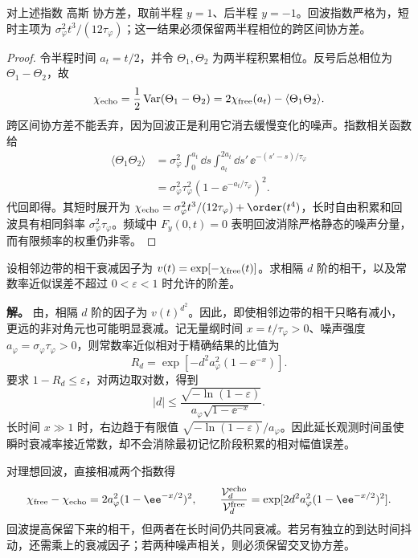 \begin{proposition}[指数相关噪声的单次反号回波]
对上述指数 高斯 协方差，取前半程 $y=1$、后半程 $y=-1$。回波指数严格为，短时主项为 $\sigma_\varphi^2t^3/(12\tau_\varphi)$；这一结果必须保留两半程相位的跨区间协方差。
\end{proposition}
\begin{proof}
令半程时间 $a_t=t/2$，并令 $\Theta_1,\Theta_2$ 为两半程积累相位。反号后总相位为 $\Theta_1-\Theta_2$，故
\begin{equation*}
 \chi_{\rm echo}=\frac12\operatorname{Var}(\Theta_1-\Theta_2)
 =2\chi_{\rm free}(a_t)-\langle\Theta_1\Theta_2\rangle.
\end{equation*}
跨区间协方差不能丢弃，因为回波正是利用它消去缓慢变化的噪声。指数相关函数给
\begin{align*}
 \langle\Theta_1\Theta_2\rangle
 &=\sigma_\varphi^2\int_0^{a_t}\dd s\int_{a_t}^{2a_t}\dd s'\,
 \ee^{-(s'-s)/\tau_\varphi}\\
 &=\sigma_\varphi^2\tau_\varphi^2(1-\ee^{-a_t/\tau_\varphi})^2.
\end{align*}
代回即得。其短时展开为
$\chi_{\rm echo}=\sigma_\varphi^2t^3/(12\tau_\varphi)+\order(t^4)$，长时自由积累和回波具有相同斜率 $\sigma_\varphi^2\tau_\varphi$。频域中 $F_y(0,t)=0$ 表明回波消除严格静态的噪声分量，而有限频率的权重仍非零。
\end{proof}


\begin{exbox}[不同阶相干对记忆误差的敏感性]
设相邻边带的相干衰减因子为 $v(t)=\exp[-\chi_{\rm free}(t)]$。求相隔 $d$ 阶的相干，以及常数率近似误差不超过 $0<\varepsilon<1$ 时允许的阶差。

\textbf{解。}
由，相隔 $d$ 阶的因子为 $v(t)^{d^2}$。因此，即使相邻边带的相干只略有减小，更远的非对角元也可能明显衰减。记无量纲时间 $x=t/\tau_\varphi>0$、噪声强度 $a_\varphi=\sigma_\varphi\tau_\varphi>0$，则常数率近似相对于精确结果的比值为
\[
R_d=\exp[-d^2a_\varphi^2(1-\ee^{-x})].
\]
要求 $1-R_d\le\varepsilon$，对两边取对数，得到
\[
|d|\le\frac{\sqrt{-\ln(1-\varepsilon)}}
{a_\varphi\sqrt{1-\ee^{-x}}}.
\]
长时间 $x\gg1$ 时，右边趋于有限值 $\sqrt{-\ln(1-\varepsilon)}/a_\varphi$。因此延长观测时间虽使瞬时衰减率接近常数，却不会消除最初记忆阶段积累的相对幅值误差。

对理想回波，直接相减两个指数得
\[
\chi_{\rm free}-\chi_{\rm echo}
=2a_\varphi^2(1-\ee^{-x/2})^2,
\qquad
\frac{\mathcal V_d^{\rm echo}}{\mathcal V_d^{\rm free}}
=\exp[2d^2a_\varphi^2(1-\ee^{-x/2})^2].
\]
回波提高保留下来的相干，但两者在长时间仍共同衰减。若另有独立的到达时间抖动，还需乘上的衰减因子；若两种噪声相关，则必须保留交叉协方差。
\end{exbox}

